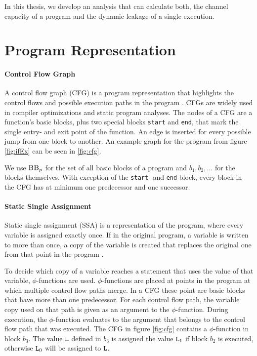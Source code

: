 In this thesis, we develop an analysis that can calculate both, the channel capacity of a program and the dynamic leakage of a single execution. 

\section{Program Representation}

\paragraph{Control Flow Graph}
A control flow graph (CFG) is a program representation that highlights the control flows and possible execution paths in the program \cite{allen70}. CFGs are widely used in compiler optimizations and static program analyses. The nodes of a CFG are a function's basic blocks, plus two special blocks \texttt{start} and \texttt{end}, that mark the single entry- and exit point of the function. An edge is inserted for every possible jump from one block to another. An example graph for the program from figure \ref{fig:ifEx} can be seen in \ref{fig:cfg}.

We use $\mbb_p$ for the set of all basic blocks of a program \p and $b_1, b_2, ...$ for the blocks themselves. With exception of the \texttt{start}- and \texttt{end}-block, every block in the CFG has at minimum one predecessor and one successor.

\paragraph{Static Single Assignment}
Static single assignment (SSA) is a representation of the program, where every variable is assigned exactly once. If in the original program, a variable is written to more than once, a copy of the variable is created that replaces the original one from that point in the program \cite{rosen88}. 

 To decide which copy of a variable reaches a statement that uses the value of that variable, $\phi$-functions are used. $\phi$-functions are placed at points in the program at which multiple control flow paths merge. In a CFG these point are basic blocks that have more than one predecessor. For each control flow path, the variable copy used on that path is given as an argument to the $\phi$-function. During execution, the $\phi$-function evaluates to the argument that belongs to the control flow path that was executed. The CFG in figure \ref{fig:cfg} contains a $\phi$-function in block $b_3$. The value $\mathtt{L}$ defined in $b_3$ is assigned the value $\mathtt{L}_1$ if block $b_2$ is executed, otherwise $\mathtt{L}_0$ will be assigned to $\mathtt{L}$.

